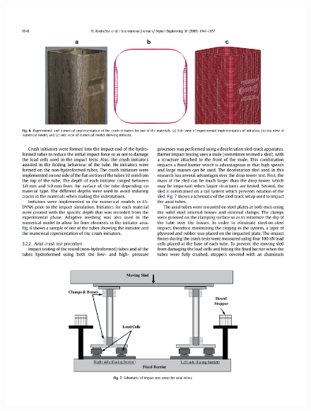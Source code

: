 \documentclass[cmfonts]{witpress}
\begin{document}
\begin{figure}
	\centering
	\begin{minipage}[b]{.23\linewidth}
		\centering
		\includegraphics[width=\linewidth]{figures/IMG_CUTRES/abedrabbo_trigger}
	\end{minipage}
	\quad
	\begin{minipage}[b]{.23\linewidth}
		\centering

\end{minipage}
\end{figure}
\end{document}
